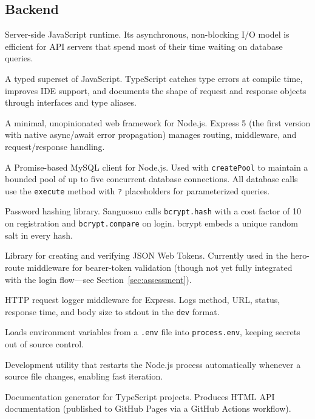 \subsection{Backend}

\begin{description}[leftmargin=2.2cm, style=nextline]
  \item[Node.js] Server-side JavaScript runtime. Its asynchronous, non-blocking I/O model is efficient for API servers that spend most of their time waiting on database queries.
  \item[TypeScript] A typed superset of JavaScript. TypeScript catches type errors at compile time, improves IDE support, and documents the shape of request and response objects through interfaces and type aliases.
  \item[Express 5] A minimal, unopinionated web framework for Node.js. Express 5 (the first version with native async/await error propagation) manages routing, middleware, and request/response handling.
  \item[mysql2] A Promise-based MySQL client for Node.js. Used with \texttt{createPool} to maintain a bounded pool of up to five concurrent database connections. All database calls use the \texttt{execute} method with \texttt{?} placeholders for parameterized queries.
  \item[bcrypt] Password hashing library. Sanguosuo calls \texttt{bcrypt.hash} with a cost factor of 10 on registration and \texttt{bcrypt.compare} on login. bcrypt embeds a unique random salt in every hash.
  \item[jsonwebtoken (JWT)] Library for creating and verifying JSON Web Tokens. Currently used in the hero-route middleware for bearer-token validation (though not yet fully integrated with the login flow---see Section~\ref{sec:assessment}).
  \item[Morgan] HTTP request logger middleware for Express. Logs method, URL, status, response time, and body size to stdout in the \texttt{dev} format.
  \item[dotenv] Loads environment variables from a \texttt{.env} file into \texttt{process.env}, keeping secrets out of source control.
  \item[Nodemon] Development utility that restarts the Node.js process automatically whenever a source file changes, enabling fast iteration.
  \item[TypeDoc] Documentation generator for TypeScript projects. Produces HTML API documentation (published to GitHub Pages via a GitHub Actions workflow).
\end{description}

